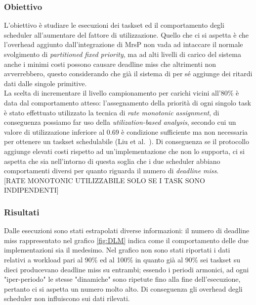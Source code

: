 \subsubsection{Obiettivo}
\label{sec:confronto_norisorsa_ob}

\noindent L'obiettivo è studiare le esecuzioni dei taskset ed il comportamento degli scheduler all'aumentare del fattore di utilizzazione. Quello che ci si aspetta è che l'overhead aggiunto dall'integrazione di MrsP non vada ad intaccare il normale svolgimento di \textit{partitioned fixed priority}, ma ad alti livelli di carico del sistema anche i minimi costi possono causare deadline miss che altrimenti non avverrebbero, questo considerando che già il sistema di per sé aggiunge dei ritardi dati dalle singole primitive.\\

\noindent La scelta di incrementare il livello campionamento per carichi vicini all'80\% è data dal comportamento atteso: l'assegnamento della priorità di ogni singolo task è stato effettuato utilizzato la tecnica di \textit{rate monotonic assignment}, di conseguenza possiamo far uso della \textit{utilization-based analysis}, secondo cui un valore di utilizzazione inferiore al 0.69 è condizione sufficiente ma non necessaria per ottenere un taskset schedulabile (Liu et al.~\cite{Liu:1973:SAM:321738.321743}). Di conseguenza se il protocollo aggiunge elevati costi rispetto ad un'implementazione che non lo supporta, ci si aspetta che sia nell'intorno di questa soglia che i due scheduler abbiano comportamenti diversi per quanto riguarda il numero di \textit{deadline miss}.\\

[RATE MONOTONIC UTILIZZABILE SOLO SE I TASK SONO INDIPENDENTI]

\subsubsection{Risultati}
\label{sec:confronto_norisorsa_ris}

\noindent Dalle esecuzioni sono stati estrapolati diverse informazioni: il numero di deadline miss rappresentato nel grafico \ref{fig:DLM} indica come il comportamento delle due implementazioni sia il medesimo. Nel grafico non sono stati riportati i dati relativi a workload pari al 90\% ed al 100\% in quanto già al 90\% sei taskset su dieci producevano deadline miss su entrambi; essendo i periodi armonici, ad ogni "iper-periodo" le stesse "dinamiche" sono ripetute fino alla fine dell'esecuzione, pertanto ci si aspetta un numero molto alto. Di conseguenza gli overhead degli scheduler non influiscono sui dati rilevati.\\

